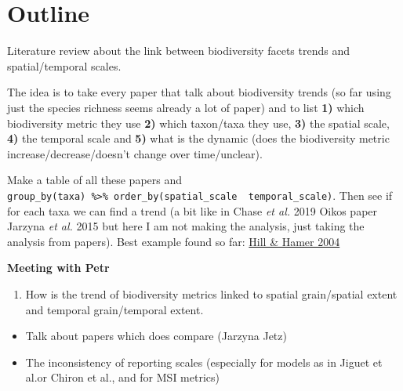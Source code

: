 \documentclass[
  12pt,
  oneside]{report}
\author{François Leroy, PhD student at CZU}
\date{2021-09-11}
\providecommand{\tightlist}{%
  \setlength{\itemsep}{0pt}\setlength{\parskip}{0pt}}
\begin{document}


\cleardoublepage 
{}

{
\hypersetup{linkcolor=}
\setcounter{tocdepth}{1}
\tableofcontents
\newpage
}
\vspace{50mm}


\cleardoublepage 
{}


\hypertarget{outline}{%
\chapter*{Outline}\label{outline}}

Literature review about the link between biodiversity facets trends and spatial/temporal scales.

The idea is to take every paper that talk about biodiversity trends (so far using just the species richness seems already a lot of paper) and to list \textbf{1)} which biodiversity metric they use \textbf{2)} which taxon/taxa they use, \textbf{3)} the spatial scale, \textbf{4)} the temporal scale and \textbf{5)} what is the dynamic (does the biodiversity metric increase/decrease/doesn't change over time/unclear).

Make a table of all these papers and \texttt{group\_by(taxa)\ \%\textgreater{}\%\ order\_by(spatial\_scale\ \textbar{}\ temporal\_scale)}. Then see if for each taxa we can find a trend (a bit like in Chase \emph{et al.} 2019 Oikos paper \textbar{} Jarzyna \emph{et al.} 2015 but here I am not making the analysis, just taking the analysis from papers). Best example found so far: \href{https://besjournals.onlinelibrary.wiley.com/doi/10.1111/j.0021-8901.2004.00926.x}{Hill \& Hamer 2004}

\textbf{Meeting with Petr}

\begin{enumerate}
\def\labelenumi{\arabic{enumi})}
\tightlist
\item
  How is the trend of biodiversity metrics linked to spatial grain/spatial extent and temporal grain/temporal extent.
\end{enumerate}

\begin{itemize}
\item
  Talk about papers which does compare (Jarzyna Jetz)
\item
  The inconsistency of reporting scales (especially for models as in Jiguet et al.or Chiron et al., and for MSI metrics)
\end{itemize}
\end{document}
